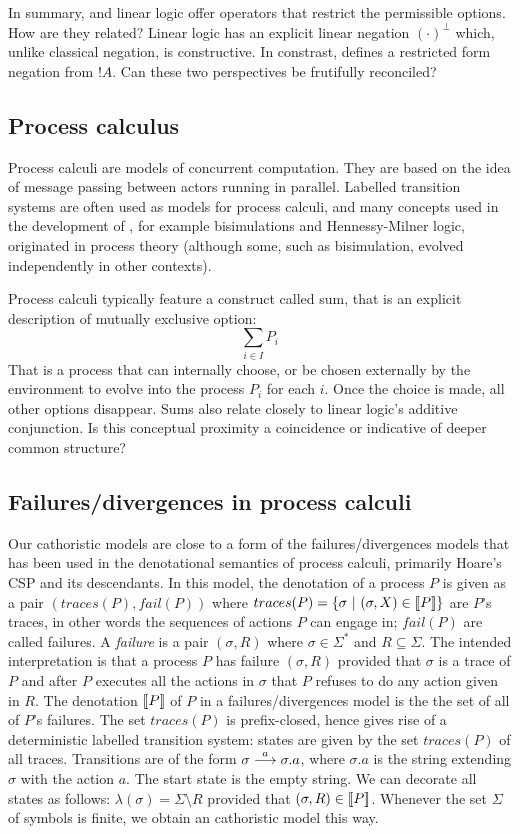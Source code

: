In summary, \cathoristic{} and linear logic offer  operators that restrict
the permissible options. How are they related? Linear logic has an
explicit linear negation $(\cdot)^{\bot}$ which, unlike classical
negation, is constructive. In constrast, \cathoristic{} defines a restricted
form negation from $!A$. Can these two perspectives be frutifully
reconciled?

\subsection{Process calculus}

Process calculi are models of concurrent computation.  They are based
on the idea of message passing between actors running in parallel.
Labelled transition systems are often used as models for process
calculi, and many concepts used in the development of \cathoristic{},
for example bisimulations and Hennessy-Milner logic, originated in
process theory (although some, such as bisimulation, evolved
independently in other contexts).

Process calculi typically feature a construct called sum, that is an
explicit description of mutually exclusive option:
\[
     \sum_{i \in I} P_i
\]
That is a process that can internally choose, or be chosen externally
by the environment to evolve into the process $P_i$ for each $i$. Once
the choice is made, all other options disappear.  Sums also relate
closely to linear logic's additive conjunction. Is this conceptual
proximity a coincidence or indicative of deeper common structure?


\subsection{Failures/divergences in process calculi}

Our cathoristic models are close to a form of the failures/divergences
models that has been used in the denotational semantics of process
calculi, primarily Hoare's CSP \cite{HoareC:comseq,RoscoeAW:theapoc}
and its descendants.  In this model, the denotation of a process $P$
is given as a pair $(traces(P), fail(P))$ where $traces(P) = \{
\sigma\ |\ (\sigma, X) \in \lbrack\!\lbrack P \rbrack\!\rbrack \}$ are $P$'s traces, in other
words the sequences of actions $P$ can engage in; $fail(P)$ are called
failures.  A \emph{failure} is a pair $(\sigma, R)$ where $\sigma \in
\Sigma^*$ and $R \subseteq \Sigma$. The intended interpretation is
that a process $P$ has failure $(\sigma, R)$ provided that $\sigma$ is
a trace of $P$ and after $P$ executes all the actions in $\sigma$ that  $P$
refuses to do any action given in $R$. The denotation $\lbrack\!\lbrack P \rbrack\!\rbrack$ of
$P$ in a failures/divergences model is the the set of all of $P$'s
failures. The set $ traces(P)$ is prefix-closed, hence gives rise of a
deterministic labelled transition system: states are given by the set
$traces(P)$ of all traces.  Transitions are of the form $\sigma
\stackrel{a}{\longrightarrow} \sigma.a$, where $\sigma.a$ is the string extending $\sigma$
with the action $a$.  The start state is the empty string.  We can
decorate all states as follows: $ \lambda (\sigma) = \Sigma \setminus
R $ provided that $(\sigma, R) \in \lbrack\!\lbrack P \rbrack\!\rbrack$.  Whenever the set
$\Sigma$ of symbols is finite, we obtain an cathoristic model this
way.


